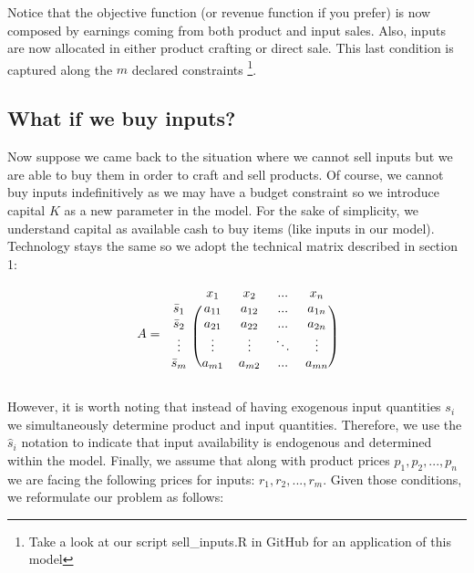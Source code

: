 \documentclass[12pt]{article}         %
\begin{document}
Notice that the objective function (or revenue function if you prefer) is now composed by earnings coming from both product and input sales. Also, inputs are now allocated in either product crafting or direct sale. This last condition is captured along the $m$ declared constraints \footnote{Take a look at our script sell\_inputs.R in GitHub for an application of this model}.

\subsection{What if we buy inputs?}
Now suppose we came back to the situation where we cannot sell inputs but we are able to buy them in order to craft and sell products. Of course, we cannot buy inputs indefinitively as we may have a budget constraint so we introduce capital $K$ as a new parameter in the model. For the sake of simplicity, we understand capital as available cash to buy items (like inputs in our model). Technology stays the same so we adopt the technical matrix described in section 1:  

\[
A = 
\begin{blockarray}{ccccc}
& x_1 & x_2 & ... & x_n \\
\begin{block}{c(cccc)}
  \bar{s}_1 & a_{11} & a_{12} & ...    & a_{1n} \\
  \bar{s}_2 & a_{21} & a_{22} & ...    & a_{2n} \\
  \vdots & \vdots & \vdots & \ddots & \vdots \\
  \bar{s}_m & a_{m1} & a_{m2} & ...    & a_{mn} \\
\end{block}
\end{blockarray}
 \]

However, it is worth noting that instead of having exogenous input quantities $s_i$ we simultaneously determine product and input quantities. Therefore, we use the $\hat{s}_i$ notation to indicate that input availability is endogenous and determined within the model. Finally, we assume that along with product prices $p_1, p_2, ..., p_n$ we are facing the following prices for inputs: $r_1, r_2, ..., r_m$. Given those conditions, we reformulate our problem as follows:
\end{document}
